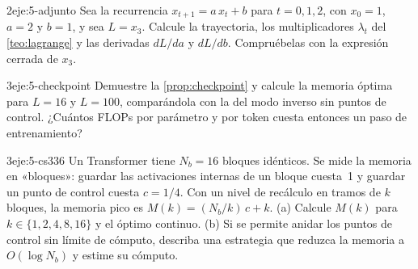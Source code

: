 \begin{ejercicio}{2}{eje:5-adjunto}
Sea la recurrencia $x_{t+1}=a\,x_t+b$ para $t=0,1,2$, con $x_0=1$, $a=2$ y $b=1$, y sea $L=x_3$. Calcule la trayectoria, los multiplicadores $\lambda_t$ del \cref{teo:lagrange} y las derivadas $dL/da$ y $dL/db$. Compruébelas con la expresión cerrada de $x_3$.
\end{ejercicio}

\begin{ejercicio}{3}{eje:5-checkpoint}
Demuestre la \cref{prop:checkpoint} y calcule la memoria óptima para $L=16$ y $L=100$, comparándola con la del modo inverso sin puntos de control. ¿Cuántos FLOPs por parámetro y por token cuesta entonces un paso de entrenamiento?
\end{ejercicio}

\begin{ejercicio}{3}{eje:5-cs336}
Un Transformer tiene $N_b=16$ bloques idénticos. Se mide la memoria en «bloques»: guardar las activaciones internas de un bloque cuesta~1 y guardar un punto de control cuesta $c=1/4$. Con un nivel de recálculo en tramos de $k$ bloques, la memoria pico es $M(k)=(N_b/k)\,c+k$. (a) Calcule $M(k)$ para $k\in\{1,2,4,8,16\}$ y el óptimo continuo. (b) Si se permite anidar los puntos de control sin límite de cómputo, describa una estrategia que reduzca la memoria a $O(\log N_b)$ y estime su cómputo.
\end{ejercicio}

